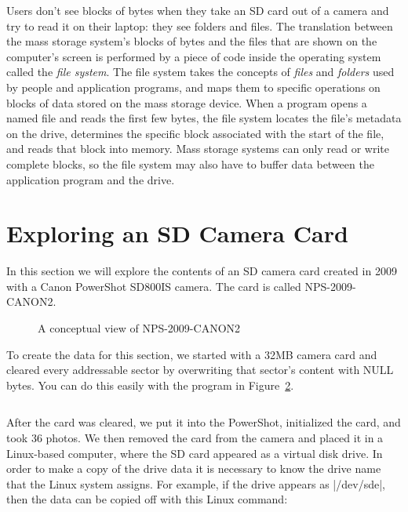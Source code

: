 \documentclass[11pt,letter]{book}
\newcommand{\figref}[1]{Figure~\ref{#1}\xspace}
\begin{document}
Users don't see blocks of bytes when they take an SD card out of a
camera and try to read it on their laptop: they see folders and
files. The translation between the mass storage system's blocks of
bytes and the files that are shown on the computer's screen is
performed by a piece of code inside the operating system called the
\emph{file system}.  The file system takes the concepts of
\emph{files} and \emph{folders} used by people and application
programs, and maps them to specific operations on blocks of data
stored on the mass storage device. When a program opens a named file
and reads the first few bytes, the file system locates the file's
metadata on the drive, determines the specific block associated with
the start of the file, and reads that block into memory. Mass storage
systems can only read or write complete blocks, so the file system may
also have to buffer data between the application program and the
drive.

\section{Exploring an SD Camera Card}
In this section we will explore the contents of an SD camera card
created in 2009 with a Canon PowerShot SD800IS camera. The card is called NPS-2009-CANON2.

\begin{figure}
\caption{A conceptual view of NPS-2009-CANON2\label{nps-2009-canon2-conceptual}}
\end{figure}

To create the data for this section, we started with a 32MB camera
card and cleared every addressable sector by overwriting that sector's
content with NULL bytes. You can do this
easily with the program in \figref{overwrite}.


\lstset{basicstyle=\footnotesize,numbers=left,numberstyle=\tiny}

\begin{figure}
\begin{lstlisting}
\end{lstlisting}
\caption{}\label{overwrite}
\end{figure}

After the card was cleared, we put it into the PowerShot, initialized
the card, and took 36 photos. We then removed the card from the
camera and placed it in a Linux-based computer, where the SD card
appeared as a virtual disk drive. In order to make a copy of the drive
data it is necessary to know the drive name that the Linux system
assigns. For example, if the drive appears as |/dev/sde|, then the
data can be copied off with this Linux  command:
\end{document}
